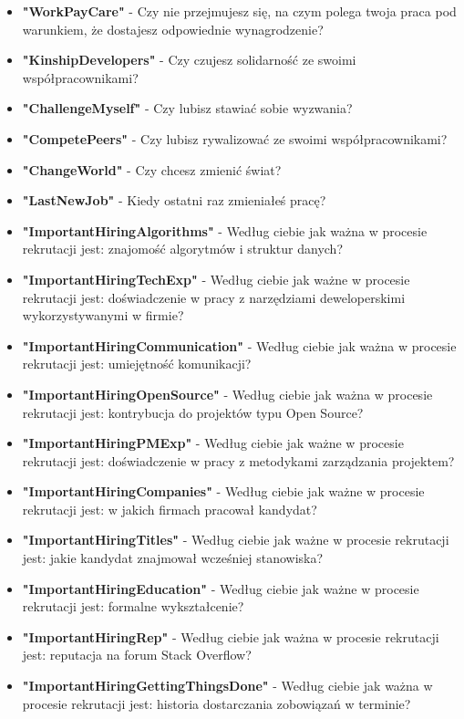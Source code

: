 \begin{appendices}
\begin{itemize}
        \item \textbf{"WorkPayCare"} - Czy nie przejmujesz się, na czym polega twoja praca pod warunkiem, że dostajesz odpowiednie wynagrodzenie?
        \item \textbf{"KinshipDevelopers"} - Czy czujesz solidarność ze swoimi współpracownikami?
        \item \textbf{"ChallengeMyself"} - Czy lubisz stawiać sobie wyzwania?
        \item \textbf{"CompetePeers"} - Czy lubisz rywalizować ze swoimi współpracownikami?
        \item \textbf{"ChangeWorld"} - Czy chcesz zmienić świat?
        \item \textbf{"LastNewJob"} - Kiedy ostatni raz zmieniałeś pracę?
        \item \textbf{"ImportantHiringAlgorithms"} - Według ciebie jak ważna w procesie rekrutacji jest: znajomość algorytmów i struktur danych?
        \item \textbf{"ImportantHiringTechExp"} - Według ciebie jak ważne w procesie rekrutacji jest: doświadczenie w pracy z narzędziami deweloperskimi wykorzystywanymi w firmie?
        \item \textbf{"ImportantHiringCommunication"} - Według ciebie jak ważna w procesie rekrutacji jest: umiejętność komunikacji?
        \item \textbf{"ImportantHiringOpenSource"} - Według ciebie jak ważna w procesie rekrutacji jest: kontrybucja do projektów typu Open Source?
        \item \textbf{"ImportantHiringPMExp"} - Według ciebie jak ważne w procesie rekrutacji jest: doświadczenie w pracy z metodykami zarządzania projektem?
        \item \textbf{"ImportantHiringCompanies"} - Według ciebie jak ważne w procesie rekrutacji jest: w jakich firmach pracował kandydat?
        \item \textbf{"ImportantHiringTitles"} - Według ciebie jak ważne w procesie rekrutacji jest: jakie kandydat znajmował wcześniej stanowiska?
        \item \textbf{"ImportantHiringEducation"} - Według ciebie jak ważne w procesie rekrutacji jest: formalne wykształcenie?
        \item \textbf{"ImportantHiringRep"} - Według ciebie jak ważna w procesie rekrutacji jest: reputacja na forum Stack Overflow?
        \item \textbf{"ImportantHiringGettingThingsDone"} - Według ciebie jak ważna w procesie rekrutacji jest: historia dostarczania zobowiązań w terminie?

\end{itemize}
\end{appendices}

